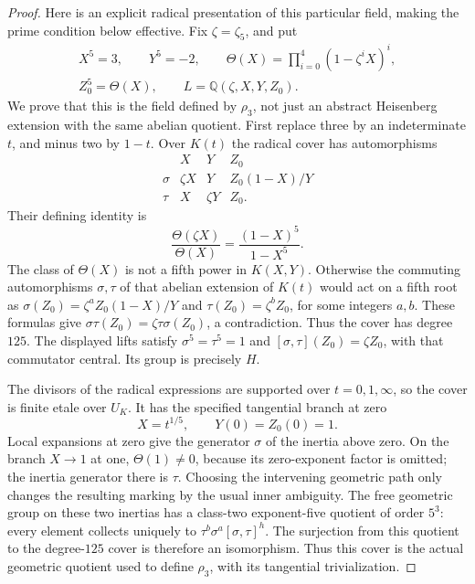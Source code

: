 \begin{proof}
Here is an explicit radical presentation of this particular
field, making the prime condition below effective. Fix
\(\zeta=\zeta_5\), and put
\[
 \begin{gathered}
 X^5=3,\qquad Y^5=-2,\qquad
 \Theta(X)=\prod_{i=0}^4(1-\zeta^iX)^i,\\
 Z_0^5=\Theta(X),\qquad
                 L=\mathbb Q(\zeta,X,Y,Z_0).
 \end{gathered}                                      \tag{1a}
\]
We prove that this is the field defined by \(\rho_3\),
not just an abstract Heisenberg extension with the same
abelian quotient. First replace three by an indeterminate
\(t\), and minus two by \(1-t\). Over \(K(t)\)
the radical cover has automorphisms
\[
 \begin{array}{c|ccc}
       &X&Y&Z_0\\\hline
 \sigma&\zeta X&Y&Z_0(1-X)/Y\\
 \tau&X&\zeta Y&Z_0.
 \end{array}                                        \tag{1b}
\]
Their defining identity is
\[
 \frac{\Theta(\zeta X)}{\Theta(X)}
       =\frac{(1-X)^5}{1-X^5}.
\]
The class of \(\Theta(X)\) is not a fifth power in
\(K(X,Y)\). Otherwise the commuting automorphisms
\(\sigma,\tau\) of that abelian extension of \(K(t)\)
would act on a fifth root as
\(\sigma(Z_0)=\zeta^a Z_0(1-X)/Y\) and
\(\tau(Z_0)=\zeta^b Z_0\), for some integers
\(a,b\). These formulas give
\(\sigma\tau(Z_0)=\zeta\tau\sigma(Z_0)\), a
contradiction. Thus the cover has degree \(125\).
The displayed lifts satisfy \(\sigma^5=\tau^5=1\)
and \([\sigma,\tau](Z_0)=\zeta Z_0\), with that
commutator central. Its group is precisely \(H\).

The divisors of the radical expressions are supported
over \(t=0,1,\infty\), so the cover is finite etale
over \(U_K\). It has the specified tangential branch
at zero
\[
           X=t^{1/5},\qquad Y(0)=Z_0(0)=1.
\]
Local expansions at zero give the generator \(\sigma\)
of the inertia above zero. On the branch \(X\to1\)
at one, \(\Theta(1)\ne0\), because its zero-exponent
factor is omitted; the inertia generator there is
\(\tau\). Choosing the intervening geometric path
only changes the resulting marking by the usual inner
ambiguity. The free geometric group on these two
inertias has a class-two exponent-five quotient of
order \(5^3\): every element collects uniquely to
\(\tau^b\sigma^a[\sigma,\tau]^h\). The surjection
from this quotient to the degree-\(125\) cover is
therefore an isomorphism. Thus this cover is the
actual geometric quotient used to define \(\rho_3\),
with its tangential trivialization.


\end{proof}

